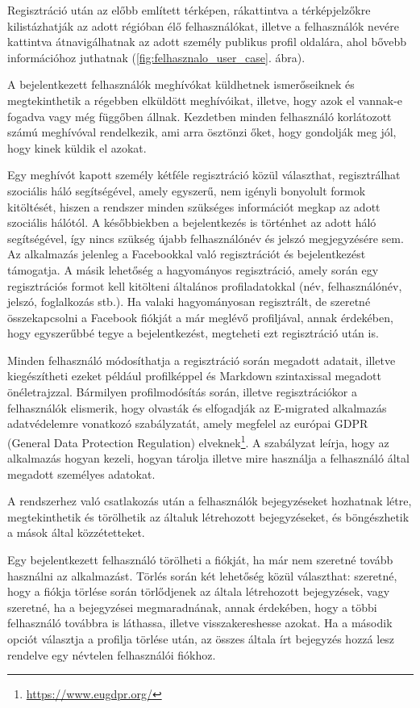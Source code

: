 Regisztráció után az előbb említett térképen, rákattintva a térképjelzőkre kilistázhatják az adott régióban élő felhasználókat, illetve a felhasználók nevére kattintva átnavigálhatnak az adott személy publikus profil oldalára, ahol bővebb információhoz juthatnak (\ref{fig:felhasznalo_user_case}. ábra). 

A bejelentkezett felhasználók meghívókat küldhetnek ismerőseiknek és megtekinthetik a régebben elküldött meghívóikat, illetve, hogy azok el vannak-e fogadva vagy még függőben állnak. Kezdetben minden felhasználó korlátozott számú meghívóval rendelkezik, ami arra ösztönzi őket, hogy gondolják meg jól, hogy kinek küldik el azokat.

Egy meghívót kapott személy kétféle regisztráció közül választhat, regisztrálhat szociális háló segítségével, amely egyszerű, nem igényli bonyolult formok kitöltését, hiszen a rendszer minden szükséges információt megkap az adott szociális hálótól. A későbbiekben a bejelentkezés is történhet az adott háló segítségével, így nincs szükség újabb felhasználónév és jelszó megjegyzésére sem. Az alkalmazás jelenleg a Facebookkal való regisztrációt és bejelentkezést támogatja. A másik lehetőség a hagyományos regisztráció, amely során egy regisztrációs formot kell kitölteni általános profiladatokkal (név, felhasználónév, jelszó, foglalkozás stb.). Ha valaki hagyományosan regisztrált, de szeretné összekapcsolni a Facebook fiókját a már meglévő profiljával, annak érdekében, hogy egyszerűbbé tegye a bejelentkezést, megteheti ezt regisztráció után is. 

Minden felhasználó módosíthatja a regisztráció során megadott adatait, illetve kiegészítheti ezeket például profilképpel és Markdown szintaxissal megadott önéletrajzzal. Bármilyen profilmodósítás során, illetve regisztrációkor a felhasználók elismerik, hogy olvasták és elfogadják az E-migrated alkalmazás adatvédelemre vonatkozó szabályzatát, amely megfelel az európai GDPR (General Data Protection Regulation) elveknek\footnote{\url{https://www.eugdpr.org/}}. A szabályzat leírja, hogy az alkalmazás hogyan kezeli, hogyan tárolja illetve mire használja a felhasználó által megadott személyes adatokat.

A rendszerhez való csatlakozás után a felhasználók bejegyzéseket hozhatnak létre, megtekinthetik és törölhetik az általuk létrehozott bejegyzéseket, és böngészhetik a mások által közzétetteket. 

Egy bejelentkezett felhasználó törölheti a fiókját, ha már nem szeretné tovább használni az alkalmazást. Törlés során két lehetőség közül választhat: szeretné, hogy a fiókja törlése során törlődjenek az általa létrehozott bejegyzések, vagy szeretné, ha a bejegyzései megmaradnának, annak érdekében, hogy a többi felhasználó továbbra is láthassa, illetve visszakereshesse azokat. Ha a második opciót választja a profilja törlése után, az összes általa írt bejegyzés hozzá lesz rendelve egy névtelen felhasználói fiókhoz.

